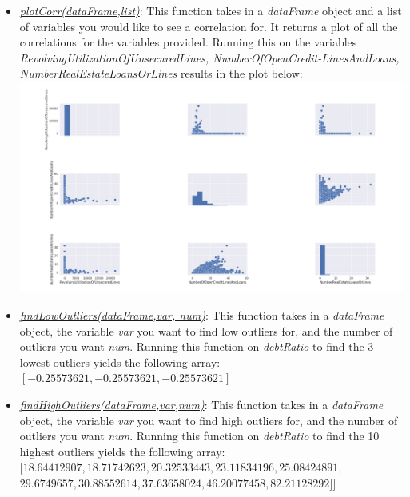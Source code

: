 \documentclass[letterpaper,12pt]{article}
\begin{document}
\begin{enumerate}
\begin{itemize}
\newpage

\item \underline{\textit{plotCorr(dataFrame,list)}}: This function takes in a \textit{dataFrame} object and a list of variables you would like to see a correlation for. It returns a plot of all the correlations for the variables provided. Running this on the variables \textit{RevolvingUtilizationOfUnsecuredLines, NumberOfOpenCredit-LinesAndLoans, NumberRealEstateLoansOrLines} results in the plot below: \\
\includegraphics[scale=0.4]{plotCorr.png}


\item \underline{\textit{findLowOutliers(dataFrame,var, num)}}: This function takes in a \textit{dataFrame} object, the variable \textit{var} you want to find low outliers for, and the number of outliers you want \textit{num}. Running this function on \textit{debtRatio} to find the 3 lowest outliers yields the following array: \\ $[-0.25573621, -0.25573621,-0.25573621]$


\item \underline{\textit{findHighOutliers(dataFrame,var,num)}}: This function takes in a \textit{dataFrame} object, the variable \textit{var} you want to find high outliers for, and the number of outliers you want \textit{num}. Running this function on \textit{debtRatio} to find the 10 highest outliers yields the following array: \\ $[18.64412907,18.71742623,20.32533443,23.11834196,25.08424891,$ \\
$29.6749657, 30.88552614, 37.63658024,46.20077458,82.21128292]]$

\newpage


\end{itemize}
\end{enumerate}
\end{document}

